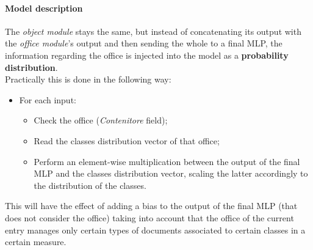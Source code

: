 \documentclass[12pt]{article}
\begin{document}
\paragraph{Model description}
The \textit{object module} stays the same, but instead of concatenating its output with the \textit{office module}'s output and then sending the whole to a final MLP, the information regarding the office is injected into the model as a \textbf{probability distribution}.\\
Practically this is done in the following way:
\begin{itemize}
    \item For each input:
    \begin{itemize}
        \item Check the office (\textit{Contenitore} field);
        \item Read the classes distribution vector of that office;
        \item Perform an element-wise multiplication between the output of the final MLP and the classes distribution vector, scaling the latter accordingly to the distribution of the classes.
    \end{itemize}
\end{itemize}
This will have the effect of adding a bias to the output of the final MLP (that does not consider the office) taking into account that the office of the current entry manages only certain types of documents associated to certain classes in a certain measure.
\end{document}
